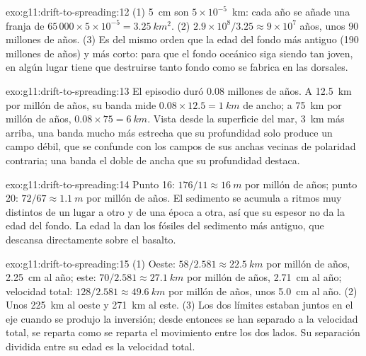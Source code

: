\begin{solution}{exo:g11:drift-to-spreading:12}
(1) \qty{5}{cm} son $5 \times 10^{-5}$~\unit{km}: cada año se añade una franja
de $65\,000 \times 5 \times 10^{-5} = \qty{3.25}{km^2}$.
(2) $2.9 \times 10^8/3.25 \approx 9 \times 10^7$ años, unos 90 millones de
años. (3) Es del mismo orden que la edad del fondo más antiguo (190 millones
de años) y más corto: para que el fondo oceánico siga siendo tan joven, en
algún lugar tiene que destruirse tanto fondo como se fabrica en las dorsales.
\end{solution}

\begin{solution}{exo:g11:drift-to-spreading:13}
El episodio duró \num{0.08} millones de años. A \qty{12.5}{km} por millón de
años, su banda mide $0.08 \times 12.5 = \qty{1}{km}$ de ancho; a \qty{75}{km}
por millón de años, $0.08 \times 75 = \qty{6}{km}$. Vista desde la superficie
del mar, \qty{3}{km} más arriba, una banda mucho más estrecha que su
profundidad solo produce un campo débil, que se confunde con los campos de
sus anchas vecinas de polaridad contraria; una banda el doble de ancha que su
profundidad destaca.
\end{solution}

\begin{solution}{exo:g11:drift-to-spreading:14}
Punto 16: $176/11 \approx \qty{16}{m}$ por millón de años; punto 20: $72/67
\approx \qty{1.1}{m}$ por millón de años. El sedimento se acumula a ritmos muy
distintos de un lugar a otro y de una época a otra, así que su espesor no da
la edad del fondo. La edad la dan los fósiles del sedimento más antiguo, que
descansa directamente sobre el basalto.
\end{solution}

\begin{solution}{exo:g11:drift-to-spreading:15}
(1) Oeste: $58/2.581 \approx \qty{22.5}{km}$ por millón de años,
\qty{2.25}{cm} al año; este: $70/2.581 \approx \qty{27.1}{km}$ por millón de
años, \qty{2.71}{cm} al año; velocidad total: $128/2.581 \approx \qty{49.6}{km}$ por
millón de años, unos \qty{5.0}{cm} al año. (2) Unos \qty{225}{km} al oeste y
\qty{271}{km} al este. (3) Los dos límites estaban juntos en el eje cuando se
produjo la inversión; desde entonces se han separado a la velocidad total,
se reparta como se reparta el movimiento entre los dos lados. Su separación
dividida entre su edad es la velocidad total.
\end{solution}

